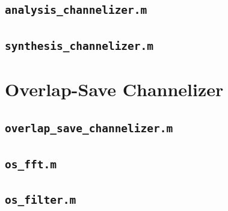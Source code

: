 \documentclass[12pt]{report}
\begin{document}
\subsection{\texttt{analysis\_channelizer.m}}

\subsection{\texttt{synthesis\_channelizer.m}}


\section{Overlap-Save Channelizer}
\subsection{\texttt{overlap\_save\_channelizer.m}}

\subsection{\texttt{os\_fft.m}}

\subsection{\texttt{os\_filter.m}}

\end{document}

